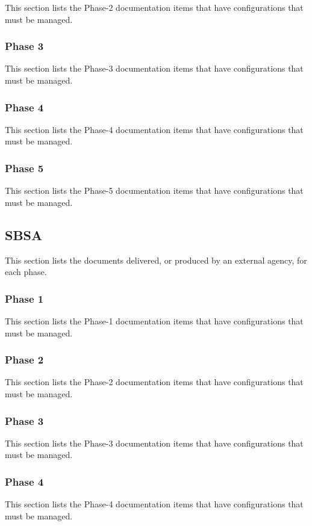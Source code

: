 This section lists the \CDS \LBSA Phase-2 documentation items that have configurations that must be managed.

\subsubsection{Phase 3}
\label{loc:CI_Docs_LBSA_Phase3}

This section lists the \CDS \LBSA Phase-3 documentation items that have configurations that must be managed.

\subsubsection{Phase 4}
\label{loc:CI_Docs_LBSA_Phase4}

This section lists the \CDS \LBSA Phase-4 documentation items that have configurations that must be managed.

\subsubsection{Phase 5}
\label{loc:CI_Docs_LBSA_Phase5}

This section lists the \CDS \LBSA Phase-5 documentation items that have configurations that must be managed.


\subsection{SBSA}
\label{loc:CI_Docs_SBSA}

This section lists the documents delivered, or produced by an external agency, for each \SBSA phase.

\subsubsection{Phase 1}
\label{loc:CI_Docs_SBSA_Phase1}

This section lists the \CDS \SBSA Phase-1 documentation items that have configurations that must be managed.

\subsubsection{Phase 2}
\label{loc:CI_Docs_SBSA_Phase2}

This section lists the \CDS \SBSA Phase-2 documentation items that have configurations that must be managed.

\subsubsection{Phase 3}
\label{loc:CI_Docs_SBSA_Phase3}

This section lists the \CDS \SBSA Phase-3 documentation items that have configurations that must be managed.

\subsubsection{Phase 4}
\label{loc:CI_Docs_SBSA_Phase4}

This section lists the \CDS \SBSA Phase-4 documentation items that have configurations that must be managed.

